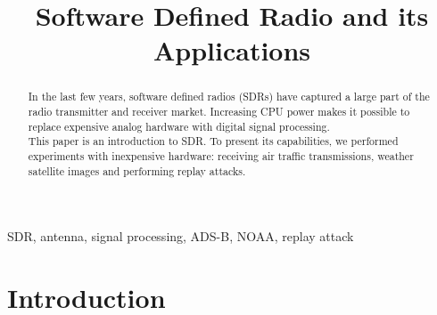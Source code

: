 \documentclass[conference]{IEEEtran}
\begin{document}
\title{Software Defined Radio and its Applications
}

\author{
	\and
}

\maketitle

\begin{abstract}
In the last few years, software defined radios (SDRs) have captured a large part of the radio transmitter and receiver market. Increasing CPU power makes it possible to replace expensive analog hardware with digital signal processing.\\
This paper is an introduction to SDR. To present its capabilities, we performed experiments with inexpensive hardware: receiving air traffic transmissions, weather satellite images and performing replay attacks.
\end{abstract}

\begin{IEEEkeywords}
SDR, antenna, signal processing, ADS-B, NOAA, replay attack 
\end{IEEEkeywords}

\section{Introduction} %
\end{document}
